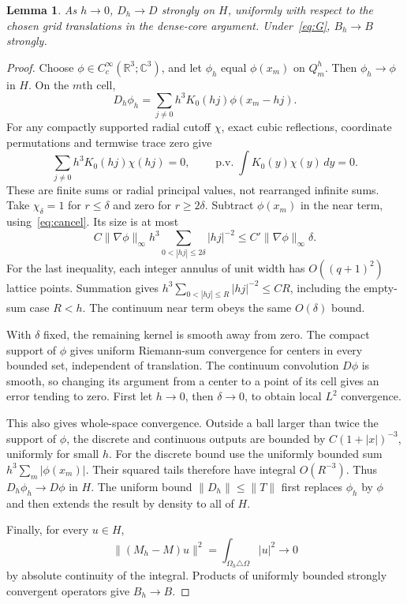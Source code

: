 \documentclass[11pt]{article}
\newtheorem{lemma}[theorem]{Lemma}
\theoremstyle{remark}\newtheorem{remark}[theorem]{Remark}
\newcommand{\R}{\mathbb R}\newcommand{\C}{\mathbb C}\newcommand{\Z}{\mathbb Z}
\newcommand{\pv}{\operatorname{p.v.}}\newcommand{\dist}{\operatorname{dist}}
\begin{document}
\begin{lemma}\label{lem:static}
As $h\to0$, $D_h\to D$ strongly on $H$, uniformly with respect to the chosen grid translations in the dense-core argument. Under~\eqref{eq:G}, $B_h\to B$ strongly.
\end{lemma}
\begin{proof}
Choose $\phi\in C_c^\infty(\R^3;\C^3)$, and let $\phi_h$ equal $\phi(x_m)$ on $Q_m^h$. Then $\phi_h\to\phi$ in $H$. On the $m$th cell,
\[
 D_h\phi_h=\sum_{j\ne0}h^3K_0(hj)\phi(x_m-hj).
\]
For any compactly supported radial cutoff $\chi$, exact cubic reflections, coordinate permutations and termwise trace zero give
\begin{equation}\label{eq:cancel}
 \sum_{j\ne0}h^3K_0(hj)\chi(hj)=0,
 \qquad \pv\int K_0(y)\chi(y)\,dy=0.
\end{equation}
These are finite sums or radial principal values, not rearranged infinite sums. Take $\chi_\delta=1$ for $r\le\delta$ and zero for $r\ge2\delta$. Subtract $\phi(x_m)$ in the near term, using~\eqref{eq:cancel}. Its size is at most
\[
 C\|\nabla\phi\|_\infty h^3
       \sum_{0<|hj|\le2\delta}|hj|^{-2}\le C'\|\nabla\phi\|_\infty\delta.
\]
For the last inequality, each integer annulus of unit width has $O((q+1)^2)$ lattice points. Summation gives $h^3\sum_{0<|hj|\le R}|hj|^{-2}\le CR$, including the empty-sum case $R<h$. The continuum near term obeys the same $O(\delta)$ bound.

With $\delta$ fixed, the remaining kernel is smooth away from zero. The compact support of $\phi$ gives uniform Riemann-sum convergence for centers in every bounded set, independent of translation. The continuum convolution $D\phi$ is smooth, so changing its argument from a center to a point of its cell gives an error tending to zero. First let $h\to0$, then $\delta\to0$, to obtain local $L^2$ convergence.

This also gives whole-space convergence. Outside a ball larger than twice the support of $\phi$, the discrete and continuous outputs are bounded by $C(1+|x|)^{-3}$, uniformly for small $h$. For the discrete bound use the uniformly bounded sum $h^3\sum_m|\phi(x_m)|$. Their squared tails therefore have integral $O(R^{-3})$. Thus $D_h\phi_h\to D\phi$ in $H$. The uniform bound $\|D_h\|\le\|T\|$ first replaces $\phi_h$ by $\phi$ and then extends the result by density to all of $H$.

Finally, for every $u\in H$,
\[
 \|(M_h-M)u\|^2=\int_{\Omega_h\triangle\Omega}|u|^2\longrightarrow0
\]
by absolute continuity of the integral. Products of uniformly bounded strongly convergent operators give $B_h\to B$.
\end{proof}
\end{document}
